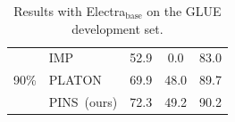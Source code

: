 \documentclass[11pt]{article}
\begin{document}
\begin{table}[h]
\begin{tabular}{c|l|ccc}
		\midrule
		\multirow{3}{*}{90\%}     &IMP                                              &   52.9                                                                                    &0.0                                                                                        &    83.0                                                                                 \\
		& PLATON                                               &  69.9                                                                                    &    48.0                                                                                    &   89.7                                                                                   \\
		&PINS~(ours)                                             &  72.3                                                                                     &     49.2                                                                                  &      90.2                                                                                \\
		\bottomrule                                     
	\end{tabular}
	\caption{Results with Electra$_{\text{base}}$ on the GLUE development set.}
	\label{table:minilm}
\end{table}
\end{document}
